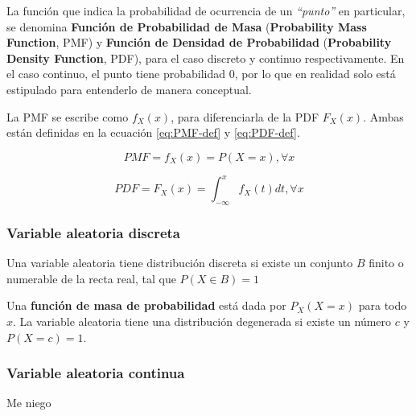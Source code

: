 \documentclass[]{article}
\begin{document}
La función que indica la probabilidad de ocurrencia de un
\emph{``punto''} en particular, se denomina \textbf{Función de
Probabilidad de Masa} (\textbf{Probability Mass Function}, PMF) y
\textbf{Función de Densidad de Probabilidad} (\textbf{Probability
Density Function}, PDF), para el caso discreto y continuo
respectivamente. En el caso continuo, el punto tiene probabilidad 0, por
lo que en realidad solo está estipulado para entenderlo de manera
conceptual.

La PMF se escribe como \(f_X(x)\), para diferenciarla de la PDF
\(F_X(x)\). Ambas están definidas en la ecuación \eqref{eq:PMF-def} y
\eqref{eq:PDF-def}.

\begin{equation}
PMF = f_X(x) = P(X=x), \text{} \forall x
\label{eq:PMF-def}
\end{equation}

\begin{equation}
PDF = F_X(x) = \int_{-\infty}^{x} f_X(t) dt, \text{} \forall x
\label{eq:PDF-def}
\end{equation}

\subsubsection{Variable aleatoria
discreta}\label{variable-aleatoria-discreta}

Una variable aleatoria tiene distribución discreta si existe un conjunto
\(B\) finito o numerable de la recta real, tal que \(P(X \in B) = 1\)

Una \textbf{función de masa de probabilidad} está dada por \(P_X(X=x)\)
para todo \(x\). La variable aleatoria tiene una distribución degenerada
si existe un número \(c\) y \(P(X=c) = 1\).

\subsubsection{Variable aleatoria
continua}\label{variable-aleatoria-continua}

Me niego
\end{document}
